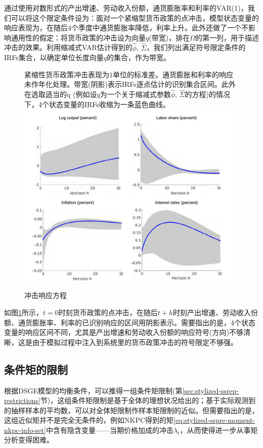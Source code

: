 通过使用对数形式的产出增速、劳动收入份额，通货膨胀率和利率的VAR(1)，我们可以将这个限定条件设为：面对一个紧缩型货币政策的点冲击，模型状态变量的响应表现为，在随后4个季度中通货膨胀率降低，利率上升。此外还做了一个不影响通用性的假定：将货币政策的冲击设为向量$q$(带宽)，排在$\Omega$的第一列，用于描述冲击的效果。利用缩减式VAR估计得到的$\hat{\phi}, \, \hat{\Sigma}$，我们列出满足符号限定条件的IRFs集合，以确定单位长度向量$q$的集合，作为带宽。
\begin{figure}[htbp]
  \caption{冲击响应方程}\small{紧缩性货币政策冲击表现为$1$单位的标准差。通货膨胀和利率的响应未作年化处理。带宽(阴影)表示IRFs逐点估计的识别集合区间。此外在选取适当的q (例如设$q$为一个关于缩减式参数$\hat{\phi}, \, \hat{\Sigma}$的方程)的情况下，4个状态变量的IRFs收缩为一条蓝色曲线。}
  \centering
  \includegraphics[width=12cm]{./Figures/20180409-irfs-var}
  \label{fig:stylized-ssrep-irfs-var}
%
\end{figure}

如图\ref{fig:stylized-ssrep-irfs-var}所示，$t=0$时刻货币政策的点冲击，在随后$t+h$时刻产出增速、劳动收入份额、通货膨胀率、利率的已识别响应的区间用阴影表示。需要指出的是，4个状态变量的响应区间不同，尤其是产出增速和劳动收入份额的响应符号(方向)不够清晰，这是由于模拟过程中注入到系统里的货币政策冲击的符号限定不够强。

\subsection{条件矩的限制}
\label{sec:stylized-ssrep-empirics-moments}
根据DSGE模型的均衡条件，可以推得一组条件矩限制(第\ref{sec:stylized-ssrep-restrictions}节)，这组条件矩限制是基于全体的理想状况给出的；基于实际观测到的抽样样本的平均数，可以对全体矩限制作样本矩限制的近似。但需要指出的是，这组近似矩并不是完全无条件的，例如NKPC得到的矩\eqref{eq:stylized-sspre-moment-nkpc-info-set}中含有隐含变量——当期价格加成的冲击$\lambda_{t}$，从而使得进一步从事矩分析变得困难。

